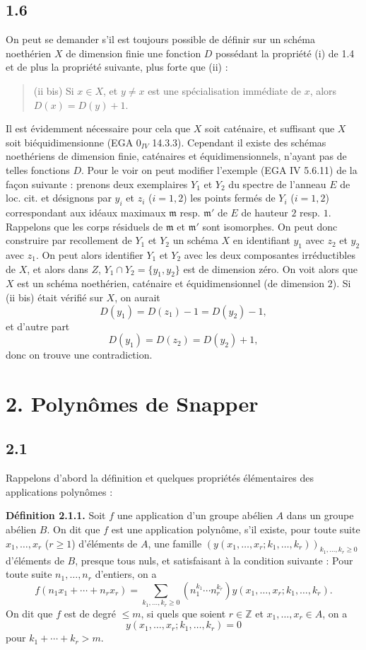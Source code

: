 \subsection*{1.6}
On peut se demander s'il est toujours possible de définir sur un schéma noethérien $X$ de dimension finie une fonction $D$ possédant la propriété (i) de 1.4 et de plus la propriété suivante, plus forte que (ii) :
\begin{quote}
(ii bis) Si $x\in X$, et $y\ne x$ est une spécialisation immédiate de $x$, alors $D(x)=D(y)+1$.
\end{quote}
Il est évidemment nécessaire pour cela que $X$ soit caténaire, et suffisant que $X$ soit biéquidimensionne (EGA $0_{IV}$ 14.3.3). Cependant il existe des schémas noethériens de dimension finie, caténaires et équidimensionnels, n'ayant pas de telles fonctions $D$. Pour le voir on peut modifier l'exemple (EGA IV 5.6.11) de la façon suivante : prenons deux exemplaires $Y_1$ et $Y_2$ du spectre de l'anneau $E$ de loc. cit. et désignons par $y_i$ et $z_i$ ($i=1,2$) les points fermés de $Y_i$ ($i=1,2$) correspondant aux idéaux maximaux $\mathfrak m$ resp. $\mathfrak m'$ de $E$ de hauteur $2$ resp. $1$. Rappelons que les corps résiduels de $\mathfrak m$ et $\mathfrak m'$ sont isomorphes. On peut donc construire par recollement de $Y_1$ et $Y_2$ un schéma $X$ en identifiant $y_1$ avec $z_2$ et $y_2$ avec $z_1$. On peut alors identifier $Y_1$ et $Y_2$ avec les deux composantes irréductibles de $X$, et alors dans $Z$, $Y_1\cap Y_2=\{y_1,y_2\}$ est de dimension zéro. On voit alors que $X$ est un schéma noethérien, caténaire et équidimensionnel (de dimension $2$). Si (ii bis) était vérifié sur $X$, on aurait
\[
D(y_1)=D(z_1)-1=D(y_2)-1,
\]
et d'autre part
\[
D(y_1)=D(z_2)=D(y_2)+1,
\]
donc on trouve une contradiction.

\section*{2. Polynômes de Snapper}

\subsection*{2.1}
Rappelons d'abord la définition et quelques propriétés élémentaires des applications polynômes :

\textbf{Définition 2.1.1.} Soit $f$ une application d'un groupe abélien $A$ dans un groupe abélien $B$. On dit que $f$ est une application polynôme, s'il existe, pour toute suite $x_1,\ldots,x_r$ ($r\geq1$) d'éléments de $A$, une famille $(y(x_1,\ldots,x_r;k_1,\ldots,k_r))_{k_1,\ldots,k_r\geq0}$ d'éléments de $B$, presque tous nuls, et satisfaisant à la condition suivante : Pour toute suite $n_1,\ldots,n_r$ d'entiers, on a
\[
f(n_1x_1+\cdots+n_rx_r)=
\sum_{k_1,\ldots,k_r\geq0}(n_1^{k_1}\cdots n_r^{k_r})
y(x_1,\ldots,x_r;k_1,\ldots,k_r).
\]
On dit que $f$ est de degré $\leq m$, si quels que soient $r\in\mathbb Z$ et $x_1,\ldots,x_r\in A$, on a
\[
y(x_1,\ldots,x_r;k_1,\ldots,k_r)=0
\]
pour $k_1+\cdots+k_r>m$.

